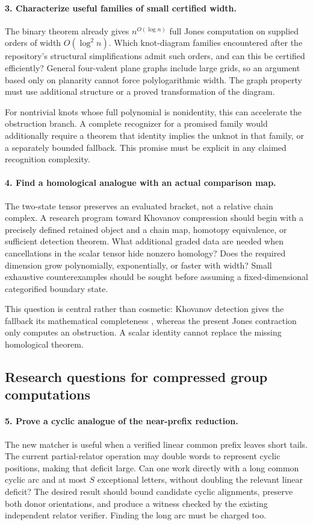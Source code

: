 \documentclass[11pt]{article}
\theoremstyle{definition}
\theoremstyle{remark}
\begin{document}
\paragraph{3. Characterize useful families of small certified width.}
The binary theorem already gives $n^{O(\log n)}$ full Jones computation
on supplied orders of width $O(\log^2 n)$. Which knot-diagram families
encountered after the repository's structural simplifications admit such
orders, and can this be certified efficiently? General four-valent plane
graphs include large grids, so an argument based only on planarity cannot
force polylogarithmic width. The graph property must use additional
structure or a proved transformation of the diagram.

For nontrivial knots whose full polynomial is nonidentity, this can
accelerate the obstruction branch. A complete recognizer for a promised
family would additionally require a theorem that identity implies the
unknot in that family, or a separately bounded fallback. This promise
must be explicit in any claimed recognition complexity.

\paragraph{4. Find a homological analogue with an actual comparison map.}
The two-state tensor preserves an evaluated bracket, not a relative
chain complex. A research program toward Khovanov compression should
begin with a precisely defined retained object and a chain map, homotopy
equivalence, or sufficient detection theorem. What additional graded
data are needed when cancellations in the scalar tensor hide nonzero
homology? Does the required dimension grow polynomially, exponentially,
or faster with width? Small exhaustive counterexamples should be sought
before assuming a fixed-dimensional categorified boundary state.

This question is central rather than cosmetic: Khovanov detection gives
the fallback its mathematical completeness \cite{kronheimer-mrowka},
whereas the present Jones contraction only computes an obstruction.
A scalar identity cannot replace the missing homological theorem.

\subsection{Research questions for compressed group computations}

\paragraph{5. Prove a cyclic analogue of the near-prefix reduction.}
The new matcher is useful when a verified linear common prefix leaves
short tails. The current partial-relator operation may double words to
represent cyclic positions, making that deficit large. Can one work
directly with a long common cyclic arc and at most $S$ exceptional
letters, without doubling the relevant linear deficit? The desired
result should bound candidate cyclic alignments, preserve both donor
orientations, and produce a witness checked by the existing independent
relator verifier. Finding the long arc must be charged too.
\end{document}
